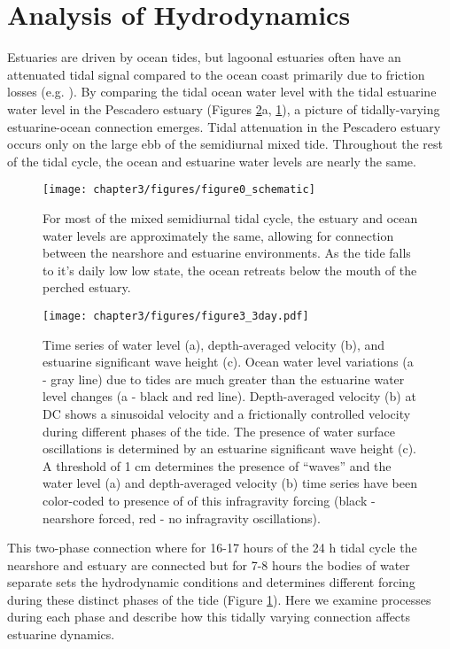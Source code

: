 \section{Analysis of Hydrodynamics}

Estuaries are driven by ocean tides, but lagoonal estuaries often
have an attenuated tidal signal compared to the ocean coast primarily
due to friction losses (e.g. \cite{rydberg_tidal_1996}).
By comparing the tidal ocean water level with the tidal estuarine
water level in the Pescadero estuary (Figures \ref{f3_HUHse}a, \ref{f4_wl_schematic}),
a picture of tidally-varying estuarine-ocean connection emerges. Tidal
attenuation in the Pescadero estuary occurs only on the large ebb
of the semidiurnal mixed tide. Throughout the rest of the tidal cycle,
the ocean and estuarine water levels are nearly the same.


\begin{figure}
\centering
\texttt{[image: chapter3/figures/figure0\_schematic]}

\protect\caption{For most of the mixed semidiurnal tidal cycle, the estuary and ocean
water levels are approximately the same, allowing for connection between
the nearshore and estuarine environments. As the tide falls to it's
daily low low state, the ocean retreats below the mouth of the perched
estuary.\label{f4_wl_schematic}}
\end{figure}

\begin{figure}[tp]
\texttt{[image: chapter3/figures/figure3\_3day.pdf]}

\protect\caption{Time series of water level (a), depth-averaged velocity (b), and estuarine
significant wave height (c). Ocean water level variations (a - gray
line) due to tides are much greater than the estuarine water level
changes (a - black and red line). Depth-averaged velocity (b) at DC
shows a sinusoidal velocity and a frictionally controlled velocity
during different phases of the tide. The presence of water surface
oscillations is determined by an estuarine significant wave height
(c). A threshold of 1 cm determines the presence of ``waves'' and
the water level (a) and depth-averaged velocity (b) time series have
been color-coded to presence of of this infragravity forcing (black
- nearshore forced, red - no infragravity oscillations). \label{f3_HUHse}}
\end{figure}

This two-phase connection where for 16-17 hours of the 24 h tidal
cycle the nearshore and estuary are connected but for 7-8 hours the
bodies of water separate sets the hydrodynamic conditions and determines
different forcing during these distinct phases of the tide (Figure
\ref{f4_wl_schematic}). Here we examine processes during each phase
and describe how this tidally varying connection affects estuarine
dynamics. 


